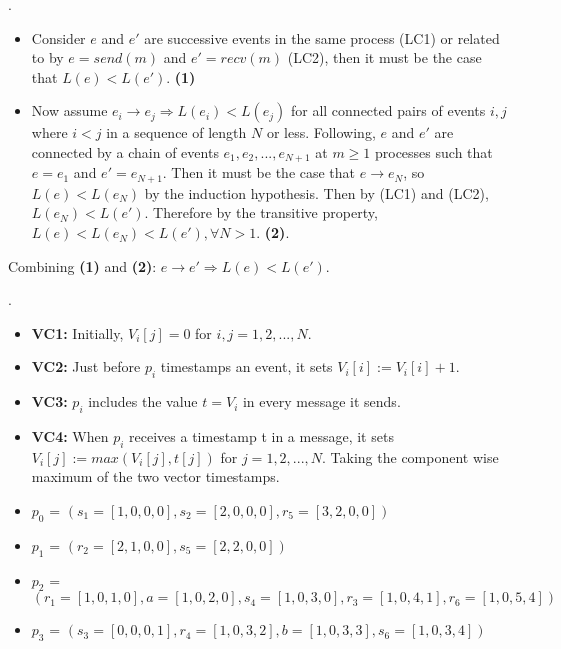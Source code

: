 \documentclass[12pt]{article}
\newcounter{question}
\newcommand{\question}[1]{
    \stepcounter{question}
    \thequestion. #1 \hfill
}
\begin{document}
\question{

    \begin{itemize}
        \item Consider $e$ and $e'$ are successive events in the same process (LC1) or related to by $e = send(m)$ and $e' = recv(m)$ (LC2), then it must be the case that $L(e) < L(e')$. \textbf{(1)}
        \item Now assume $e_i \rightarrow e_j \Rightarrow L(e_i) < L(e_j)$ for all connected pairs of events $i,j$ where $i<j$ in a sequence of length $N$ or less. Following, $e$ and $e'$ are connected by a chain of events $e_1,e_2,...,e_{N+1}$ at $m \geq 1$ processes such that $e = e_1$ and $e' = e_{N+1}$. Then it must be the case that $e \rightarrow e_N$, so $L(e) < L(e_N)$ by the induction hypothesis. Then by (LC1) and (LC2), $L(e_N) < L(e')$. Therefore by the transitive property, $L(e) < L(e_N) < L(e'), \forall N>1$. \textbf{(2)}.
    \end{itemize}
    Combining \textbf{(1)} and \textbf{(2)}: $e \rightarrow e' \Rightarrow L(e) < L(e')$.
}

\question{
    \begin{itemize}
        \item \textbf{VC1:} Initially, $V_i[j] = 0$ for $i,j = 1,2,...,N$.
        \item \textbf{VC2:} Just before $p_i$ timestamps an event, it sets $V_i[i] := V_i[i]+1$.
        \item \textbf{VC3:} $p_i$ includes the value $t = V_i$ in every message it sends.
        \item \textbf{VC4:} When $p_i$ receives a timestamp t in a message, it sets $V_i[j] := max(V_i[j], t[j])$ for $j = 1,2,...,N$. Taking the component wise maximum of the two vector timestamps.
    \end{itemize}

    \begin{itemize}
        \item $p_0$ = $(s_1=[1,0,0,0], s_2=[2,0,0,0], r_5 = [3,2,0,0])$
        \item $p_1$ = $(r_2=[2,1,0,0], s_5=[2,2,0,0])$
        \item $p_2$ = $(r_1=[1,0,1,0], a=[1,0,2,0], s_4=[1,0,3,0], r_3=[1,0,4,1], r_6=[1,0,5,4])$
        \item $p_3$ = $(s_3=[0,0,0,1], r_4=[1,0,3,2], b=[1,0,3,3], s_6=[1,0,3,4])$
    \end{itemize}
}
\end{document}
